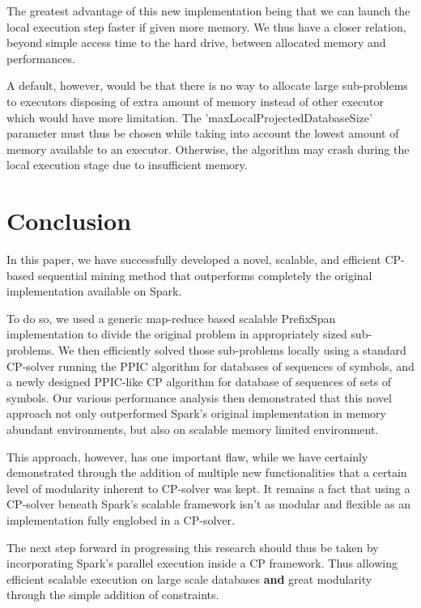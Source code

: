 \documentclass{eplmastersthesis}
\begin{document}
The greatest advantage of this new implementation being that we can launch the local execution step faster if given more memory. We thus have a closer relation, beyond simple access time to the hard drive, between allocated memory and performances. \newline

A default, however, would be that there is no way to allocate large sub-problems to executors disposing of extra amount of memory instead of other executor which would have more limitation. The 'maxLocalProjectedDatabaseSize' parameter must thus be chosen while taking into account the lowest amount of memory available to an executor. Otherwise, the algorithm may crash during the local execution stage due to insufficient memory.

\newpage
\section{Conclusion}

In this paper, we have successfully developed a novel, scalable, and
efficient CP-based sequential mining method that outperforms completely the original implementation available on Spark.\newline

To do so, we used a generic map-reduce based scalable PrefixSpan implementation to divide the original problem in appropriately sized sub-problems. We then efficiently solved those sub-problems locally using a standard CP-solver running the PPIC algorithm for databases of sequences of symbols, and a newly designed PPIC-like CP algorithm for database of sequences of sets of symbols. Our various performance analysis then demonstrated that this novel approach not only outperformed Spark's original implementation in memory abundant environments, but also on scalable memory limited environment. \newline

This approach, however, has one important flaw, while we have certainly demonstrated through the addition of multiple new functionalities that a certain level of modularity inherent to CP-solver was kept. It remains a fact that using a CP-solver beneath Spark's scalable framework isn't as modular and flexible as an implementation fully englobed in a CP-solver.

The next step forward in progressing this research should thus be taken by incorporating Spark's parallel execution inside a CP framework. Thus allowing efficient scalable execution on large scale databases \textbf{and} great modularity through the simple addition of constraints.
\end{document}
